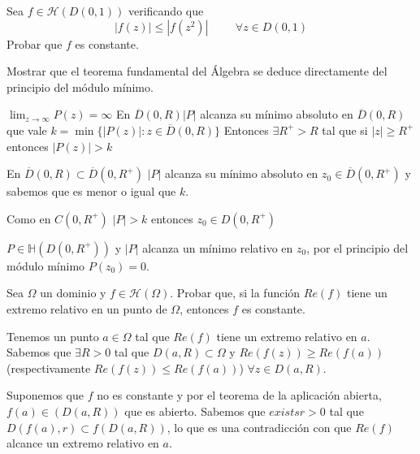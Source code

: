 \begin{sol}
\begin{comment}
	$f$ no es inyectiva en un entorno de un punto donde se anule la derivada, por tanto tenemos una contradicción ya que $f$ es inyectiva.
	
	Si $f$ es entera no polinómica, como consecuencia del teorema de Casorati $f(\mathbb{C}\backslash\overline{D}(0,R))$ es denso en $\mathbb{C}$
	
	Por el teorema de la aplicación abierta sabemos que $f(D(0,r))$
	Entonces hay dos puntos donde la función vale lo mismo, por tanto no puede ser inyectiva.
	
\end{comment}
\end{sol}



\begin{ejer}
	Sea $f\in\mathcal{H}(D(0,1))$ verificando que
	$$ |f(z)| \leq |f(z^2)| \hspace{1cm} \forall z\in D(0,1) $$
	Probar que $f$ es constante.
\end{ejer}



\begin{ejer}
	Mostrar que el teorema fundamental del Álgebra se deduce directamente del principio del módulo mínimo.
\end{ejer}
\begin{sol}
$\lim_{z\rightarrow\infty} P(z) = \infty$
En  $\overline{D}(0,R) |P|$ alcanza su mínimo absoluto en $\overline{D}(0,R)$ que vale $k=\min\{ |P(z)| : z\in\overline{D}(0,R) \}$ 
Entonces
$\exists R^+>R$ tal que si $|z|\geq R^+$ entonces $|P(z)| > k$

En $\overline{D}(0,R) \subset \overline{D}(0,R^+)$ $|P|$ alcanza su mínimo absoluto en $z_0\in\overline{D}(0,R^+)$ y sabemos que es menor o igual que $k$.

Como en $C(0,R^+)$ $|P|>k$ entonces $z_0\in D(0,R^+)$

$P\in\mathbb{H}(D(0,R^+))$ y $|P|$ alcanza un mínimo relativo en $z_0$, por el principio del módulo mínimo $P(z_0)=0$.
\end{sol}


\begin{ejer}
	Sea $\Omega$ un dominio y $f\in\mathcal{H}(\Omega)$.
	Probar que, si la función $Re(f)$ tiene un extremo relativo en un punto de $\Omega$, entonces $f$ es constante.
\end{ejer}
\begin{sol}
Tenemos un punto $a\in\Omega$ tal que $Re(f)$ tiene un extremo relativo en $a$.
Sabemos que $\exists R>0$ tal que $D(a,R)\subset\Omega$ y 
$Re(f(z)) \geq Re(f(a))$ (respectivamente $Re(f(z))\leq Re(f(a))$) $\forall z\in D(a,R)$.

Suponemos que $f$ no es constante y por el teorema de la aplicación abierta, $f(a)\in(D(a,R))$ que es abierto.
Sabemos que $exists r>0$ tal que $D(f(a),r) \subset f(D(a,R))$, lo que es una contradicción con que $Re(f)$ alcance un extremo relativo en $a$.
\end{sol}



